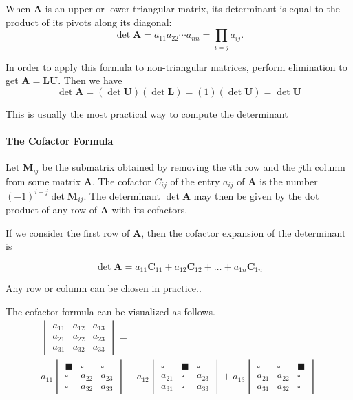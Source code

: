 \documentclass[10pt,landscape,letterpaper]{article}
\newcommand{\matr}[1]{\mathbf{#1}}
\begin{document}
\begin{multicols}{3}
When $\matr{A}$ is an upper or lower triangular matrix, its determinant is equal to the product of its pivots along its diagonal:
\begin{equation*}
\det \matr{A} = a_{11} a_{22} \cdots a_{nn} = \prod_{i = j} a_{ij}.
\end{equation*}

In order to apply this formula to non-triangular matrices, perform elimination to get $\matr{A=LU}$. Then we have
\begin{equation*}
\det \matr{A} = (\det \matr{U})(\det \matr{L}) = (1)(\det \matr{U}) = \det \matr{U}
\end{equation*}

This is usually the most practical way to compute the determinant

\paragraph{The Cofactor Formula} \label{det-cofactor}

Let $\matr{M}_{ij}$ be the submatrix obtained by removing the $i$th row and the $j$th column from some matrix $\matr{A}$. The cofactor $C_{ij}$ of the entry $a_{ij}$ of $\matr{A}$ is the number $(-1)^{i+j} \det \matr{M}_{ij}$. The determinant $\det \matr{A}$ may then be given by the dot product of any row of $\matr{A}$ with its cofactors.

If we consider the first row of $\matr{A}$, then the cofactor expansion of the determinant is

\begin{equation*}
\boxed{\det \matr{A} = a_{11} \matr{C}_{11} + a_{12} \matr{C}_{12} + \dots + a_{1n} \matr{C}_{1n}}
\end{equation*}

Any row or column can be chosen in practice.. 

The cofactor formula can be visualized as follows.
\begin{gather*}
\begin{vmatrix}
a_{11} & a_{12} & a_{13} \\
a_{21} & a_{22} & a_{23} \\
a_{31} & a_{32} & a_{33}
\end{vmatrix}
= \\ a_{11} \begin{vmatrix}
\blacksquare & \square & \square \\
\square & a_{22} & a_{23} \\
\square & a_{32} & a_{33}
\end{vmatrix}
- a_{12} \begin{vmatrix}
\square & \blacksquare & \square \\
a_{21} & \square & a_{23} \\
a_{31} & \square & a_{33}
\end{vmatrix}
+ a_{13} \begin{vmatrix}
\square & \square & \blacksquare \\
a_{21} & a_{22} & \square  \\
a_{31} & a_{32} & \square 
\end{vmatrix}
\end{gather*}


\end{multicols}
\end{document}
